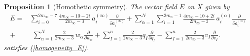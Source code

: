 \documentclass[a4paper,12pt,reqno]{amsart}
\newcounter{counter2}
\numberwithin{equation}{section}
\numberwithin{counter2}{section}
\newcounter{counter3}
\newtheorem{prop}[counter2]{Proposition}
\begin{document}
\begin{prop}[Homothetic symmetry]\label{Euler1}
The vector field $E$ on $X$ given by 
\begin{align}
\nonumber E = &\sum_{i = 0}^{2m_\infty - 7} \frac{4m_\infty-10-2i}{2m_\infty-3} \, a_i^{(\infty)} \frac{\partial}{\partial a_{i}^{(\infty)}} + \sum_{\alpha=1}^{N}\sum_{i=1}^{2m_\alpha-1} \frac{4m_\infty-10+2i}{2m_\infty-3} \,  a_i^{(\alpha)}\frac{\partial}{\partial a_{i}^{(\alpha)}} \\ + & \ \, \sum_{\alpha=1}^{N}\frac{2}{2m_\infty-3} \,  w_\alpha \frac{\partial}{\partial w_\alpha} + \sum_{I=1}^{n} \frac{2}{2m_\infty-3}q_I \frac{\partial}{\partial q_I} -  \sum_{I=1}^{n} \frac{2}{2m_\infty-3}v_I \frac{\partial}{\partial v_I}.  
\end{align}
satisfies \textup{(\ref{homogeneity_E})}.  
\end{prop}
\end{document}
